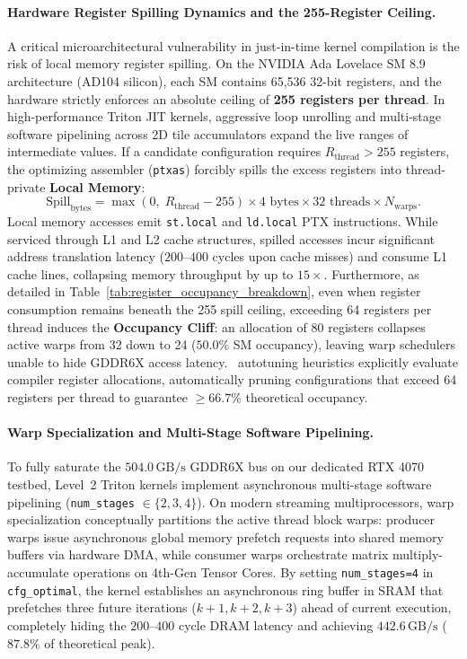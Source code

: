 \paragraph{Hardware Register Spilling Dynamics and the 255-Register Ceiling.}
A critical microarchitectural vulnerability in just-in-time kernel compilation is the risk of local memory register spilling. On the NVIDIA Ada Lovelace SM 8.9 architecture (AD104 silicon), each SM contains 65,536 32-bit registers, and the hardware strictly enforces an absolute ceiling of \textbf{255 registers per thread}. In high-performance Triton JIT kernels, aggressive loop unrolling and multi-stage software pipelining across 2D tile accumulators expand the live ranges of intermediate values. If a candidate configuration requires $R_{\text{thread}} > 255$ registers, the optimizing assembler (\texttt{ptxas}) forcibly spills the excess registers into thread-private \textbf{Local Memory}:
\begin{equation}
\label{eq:register_spill_bytes}
\text{Spill}_{\text{bytes}} = \max\left(0, \; R_{\text{thread}} - 255\right) \times 4\text{ bytes} \times 32\text{ threads} \times N_{\text{warps}}.
\end{equation}
Local memory accesses emit \texttt{st.local} and \texttt{ld.local} PTX instructions. While serviced through L1 and L2 cache structures, spilled accesses incur significant address translation latency ($200\text{--}400$ cycles upon cache misses) and consume L1 cache lines, collapsing memory throughput by up to $15\times$. Furthermore, as detailed in Table~\ref{tab:register_occupancy_breakdown}, even when register consumption remains beneath the 255 spill ceiling, exceeding 64 registers per thread induces the \textbf{Occupancy Cliff}: an allocation of 80 registers collapses active warps from 32 down to 24 ($50.0\%$ SM occupancy), leaving warp schedulers unable to hide GDDR6X access latency. \neuralops\ autotuning heuristics explicitly evaluate compiler register allocations, automatically pruning configurations that exceed 64 registers per thread to guarantee $\ge 66.7\%$ theoretical occupancy.

\paragraph{Warp Specialization and Multi-Stage Software Pipelining.}
To fully saturate the $504.0\,\text{GB/s}$ GDDR6X bus on our dedicated RTX 4070 testbed, Level~2 Triton kernels implement asynchronous multi-stage software pipelining (\texttt{num\_stages} $\in \{2, 3, 4\}$). On modern streaming multiprocessors, warp specialization conceptually partitions the active thread block warps: producer warps issue asynchronous global memory prefetch requests into shared memory buffers via hardware DMA, while consumer warps orchestrate matrix multiply-accumulate operations on 4th-Gen Tensor Cores. By setting \texttt{num\_stages=4} in \texttt{cfg\_optimal}, the kernel establishes an asynchronous ring buffer in SRAM that prefetches three future iterations ($k+1, k+2, k+3$) ahead of current execution, completely hiding the $200\text{--}400$ cycle DRAM latency and achieving $442.6\,\text{GB/s}$ ($87.8\%$ of theoretical peak).

